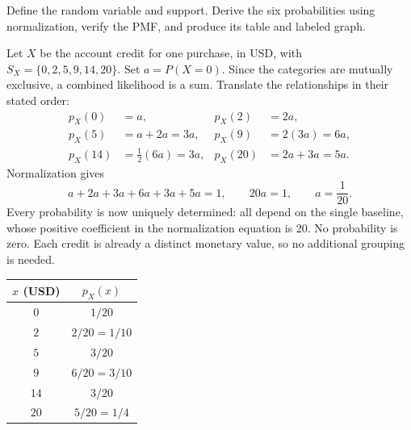Define the random variable and support. Derive the six probabilities using normalization, verify the PMF, and produce its table and labeled graph.

Let $X$ be the account credit for one purchase, in USD, with $S_X=\{0,2,5,9,14,20\}$. Set $a=P(X=0)$. Since the categories are mutually exclusive, a combined likelihood is a sum. Translate the relationships in their stated order:
\begin{align*}
p_X(0)&=a,&p_X(2)&=2a,\\
p_X(5)&=a+2a=3a,&p_X(9)&=2(3a)=6a,\\
p_X(14)&=\tfrac12(6a)=3a,&p_X(20)&=2a+3a=5a.
\end{align*}
Normalization gives
\[
a+2a+3a+6a+3a+5a=1,\qquad 20a=1,\qquad a=\frac1{20}.
\]
Every probability is now uniquely determined: all depend on the single baseline, whose positive coefficient in the normalization equation is 20. No probability is zero. Each credit is already a distinct monetary value, so no additional grouping is needed.

\begin{center}
\begin{minipage}{.26\linewidth}\centering
\begin{tabular}{cc}\toprule
$x$ (USD) & $p_X(x)$\\\midrule
$0$ & $1/20$\\
$2$ & $2/20=1/10$\\
$5$ & $3/20$\\
$9$ & $6/20=3/10$\\
$14$ & $3/20$\\
$20$ & $5/20=1/4$\\
\bottomrule\end{tabular}
\end{minipage}\hfill
\begin{minipage}{.70\linewidth}\centering
{}
\end{minipage}
\end{center}

